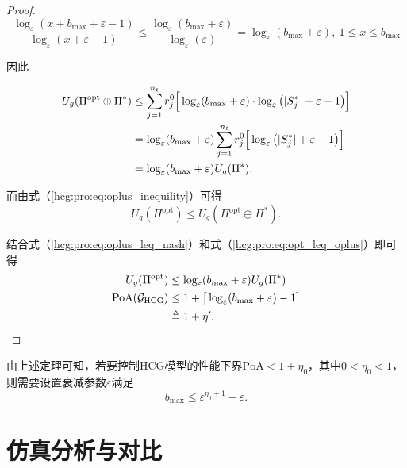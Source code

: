 \begin{proposition}
\begin{proof}
		\begin{equation}
			\frac{\log_{\varepsilon}(x+b_{\text{max}}+\varepsilon-1)}{\log_{\varepsilon}(x+\varepsilon-1)} \leq \frac{\log_{\varepsilon}(b_{\text{max}}+\varepsilon)}{\log_{\varepsilon}(\varepsilon)} = \log_{\varepsilon}(b_{\text{max}}+\varepsilon),\ 1\leq x \leq b_{\text{max}}
		\end{equation}
		
		因此
		
		\begin{align}
			\label{hcg:pro:eq:oplus_leq_nash}
			U_g(\Pi^{\text{opt}} \oplus \Pi^*) &\leq \sum_{j=1}^{n_t} r_j^0 \Big[\log_{\varepsilon}(b_{\text{max}}+\varepsilon) \cdot \log_{\varepsilon}\big(|S_j^*|+ \varepsilon - 1\big) \Big]\notag\\
			&= \log_{\varepsilon}(b_{\text{max}}+\varepsilon) \sum_{j=1}^{n_t} r_j^0 \Big[\log_{\varepsilon}\big(|S_j^*|+ \varepsilon - 1\big) \Big]\notag\\
			&= \log_{\varepsilon}(b_{\text{max}}+\varepsilon) U_g(\Pi^*).
		\end{align}
		
		而由式（\ref{hcg:pro:eq:oplus_inequility}）可得
		\begin{equation}
		\label{hcg:pro:eq:opt_leq_oplus}
			U_g(\Pi^{\text{opt}}) \leq U_g(\Pi^{\text{opt}} \oplus \Pi^*).
		\end{equation}
		
		结合式（\ref{hcg:pro:eq:oplus_leq_nash}）和式（\ref{hcg:pro:eq:opt_leq_oplus}）即可得
		\begin{align}
		\label{hcg:pro:eq:PoA_max}
			U_g(\Pi^{\text{opt}}) &\leq \log_{\varepsilon}(b_{\text{max}}+\varepsilon) U_g(\Pi^*)\\
			\mathrm{PoA}(\mathcal{G}_{\text{HCG}}) &\leq 1+ \big[\log_{\varepsilon}(b_{\text{max}}+\varepsilon) -1\big]\notag\\
			&\triangleq 1+\eta'.
		\end{align}
		
				
		\end{proof}
\end{proposition}


由上述定理可知，若要控制HCG模型的性能下界$\mathrm{PoA}<1+\eta_0$，其中$0<\eta_0<1$，则需要设置衰减参数$\varepsilon$满足
\begin{equation}
\label{hcg:eq:require_epsilon}
	b_{\text{max}} \leq \varepsilon^{\eta_0+1} - \varepsilon.
\end{equation}


\section{仿真分析与对比}
\label{hg:sec:simulation}

